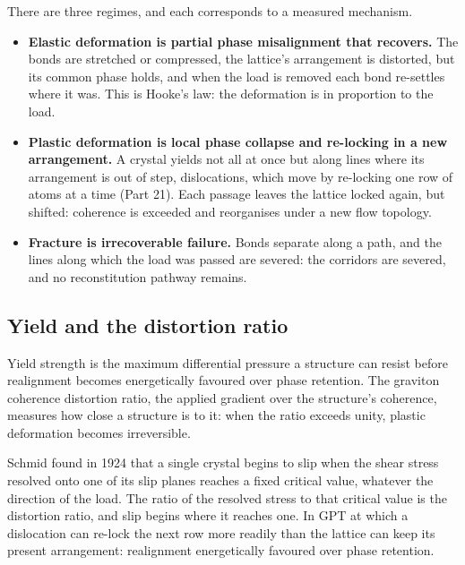 \begin{hypbar}
There are three regimes, and each corresponds to a measured mechanism.
\begin{itemize}
\item \textbf{Elastic deformation is partial phase misalignment that recovers.} The bonds are stretched or compressed, the lattice's arrangement is distorted, but its common phase holds, and when the load is removed each bond re-settles where it was. This is Hooke's law: the deformation is in proportion to the load.
\item \textbf{Plastic deformation is local phase collapse and re-locking in a new arrangement.} A crystal yields not all at once but along lines where its arrangement is out of step, dislocations, which move by re-locking one row of atoms at a time (Part 21). Each passage leaves the lattice locked again, but shifted: coherence is exceeded and reorganises under a new flow topology.
\item \textbf{Fracture is irrecoverable failure.} Bonds separate along a path, and the lines along which the load was passed are severed: the corridors are severed, and no reconstitution pathway remains.
\end{itemize}
\end{hypbar}

\subsection{Yield and the distortion ratio}

Yield strength is the maximum differential pressure a structure can resist before realignment becomes energetically favoured over phase retention. The graviton coherence distortion ratio, the applied gradient over the structure's coherence, measures how close a structure is to it: when the ratio exceeds unity, plastic deformation becomes irreversible.

 Schmid found in 1924 that a single crystal begins to slip when the shear stress resolved onto one of its slip planes reaches a fixed critical value, whatever the direction of the load. The ratio of the resolved stress to that critical value is the distortion ratio, and slip begins where it reaches one. In GPT  at which a dislocation can re-lock the next row more readily than the lattice can keep its present arrangement: realignment energetically favoured over phase retention.

